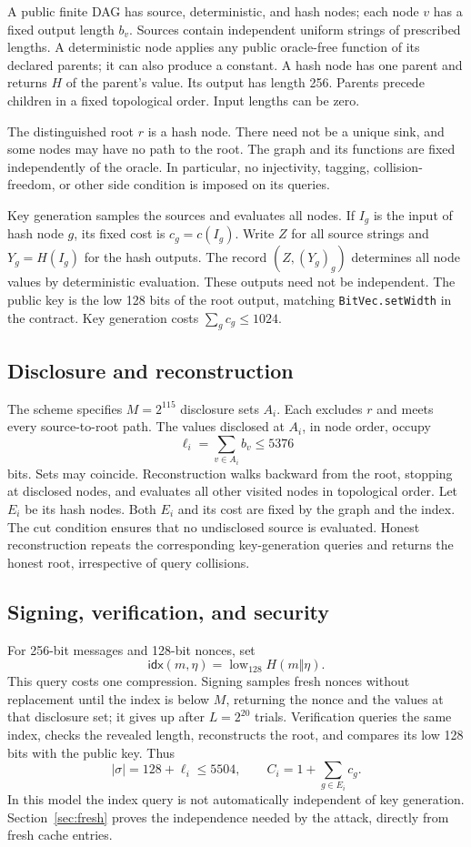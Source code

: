 \documentclass[10pt]{article}
\begin{document}
A public finite DAG has source, deterministic, and hash nodes; each node $v$ has a fixed output length $b_v$. Sources contain independent uniform strings of prescribed lengths. A deterministic node applies any public oracle-free function of its declared parents; it can also produce a constant. A hash node has one parent and returns $H$ of the parent's value. Its output has length 256. Parents precede children in a fixed topological order. Input lengths can be zero.

The distinguished root $r$ is a hash node. There need not be a unique sink, and some nodes may have no path to the root. The graph and its functions are fixed independently of the oracle. In particular, no injectivity, tagging, collision-freedom, or other side condition is imposed on its queries.

Key generation samples the sources and evaluates all nodes. If $I_g$ is the input of hash node $g$, its fixed cost is $c_g=c(I_g)$. Write $Z$ for all source strings and $Y_g=H(I_g)$ for the hash outputs. The record $(Z,(Y_g)_g)$ determines all node values by deterministic evaluation. These outputs need not be independent. The public key is the low 128 bits of the root output, matching \texttt{BitVec.setWidth} in the contract. Key generation costs $\sum_g c_g\le1024$.

\subsection{Disclosure and reconstruction}

The scheme specifies $M=2^{115}$ disclosure sets $A_i$. Each excludes $r$ and meets every source-to-root path. The values disclosed at $A_i$, in node order, occupy
\[
\ell_i=\sum_{v\in A_i}b_v\le5376
\]
bits. Sets may coincide. Reconstruction walks backward from the root, stopping at disclosed nodes, and evaluates all other visited nodes in topological order. Let $E_i$ be its hash nodes. Both $E_i$ and its cost are fixed by the graph and the index. The cut condition ensures that no undisclosed source is evaluated. Honest reconstruction repeats the corresponding key-generation queries and returns the honest root, irrespective of query collisions.

\subsection{Signing, verification, and security}

For 256-bit messages and 128-bit nonces, set
\[
\mathsf{idx}(m,\eta)=\operatorname{low}_{128}H(m\Vert\eta).
\]
This query costs one compression. Signing samples fresh nonces without replacement until the index is below $M$, returning the nonce and the values at that disclosure set; it gives up after $L=2^{20}$ trials. Verification queries the same index, checks the revealed length, reconstructs the root, and compares its low 128 bits with the public key. Thus
\[
|\sigma|=128+\ell_i\le5504,\qquad
C_i=1+\sum_{g\in E_i}c_g.
\]
In this model the index query is not automatically independent of key generation. Section~\ref{sec:fresh} proves the independence needed by the attack, directly from fresh cache entries.
\end{document}
